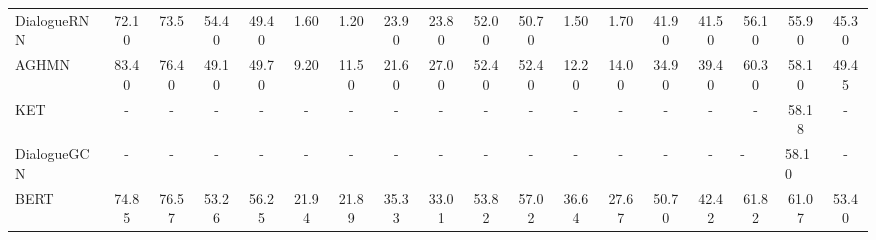 \documentclass[letterpaper]{article} \usepackage{aaai21}  \usepackage{times}  \usepackage{helvet} \usepackage{courier}  \usepackage[hyphens]{url}  \usepackage{graphicx} \urlstyle{rm} \def\UrlFont{\rm}  \usepackage{natbib}  \usepackage{caption} \usepackage{multirow}
\begin{document}
\begin{table*}
{\begin{tabular}{@{}l|ccccccccccccccccc@{}}
DialogueRNN\cite{DialogueRNN}              & 72.10                     & \multicolumn{1}{c|}{73.5}           & 54.40                     & \multicolumn{1}{c|}{49.40}          & 1.60                      & \multicolumn{1}{c|}{1.20}           & 23.90                     & \multicolumn{1}{c|}{23.80}          & 52.00                     & \multicolumn{1}{c|}{50.70}          & 1.50                      & \multicolumn{1}{c|}{1.70}           & 41.90                     & \multicolumn{1}{c|}{41.50}          & 56.10                 & 55.90                     & 45.30          \\
AGHMN\cite{AGHMN}                    & 83.40                     & \multicolumn{1}{c|}{76.40}          & 49.10                     & \multicolumn{1}{c|}{49.70}          & 9.20                      & \multicolumn{1}{c|}{11.50}          & 21.60                     & \multicolumn{1}{c|}{27.00}          & 52.40                     & \multicolumn{1}{c|}{52.40}          & 12.20                     & \multicolumn{1}{c|}{14.00}          & 34.90                     & \multicolumn{1}{c|}{39.40}          & 60.30                 & 58.10                     & 49.45          \\
KET\cite{KET}                      & -                         & \multicolumn{1}{c|}{-}              & -                         & \multicolumn{1}{c|}{-}              & -                         & \multicolumn{1}{c|}{-}              & -                         & \multicolumn{1}{c|}{-}              & -                         & \multicolumn{1}{c|}{-}              & -                         & \multicolumn{1}{c|}{-}              & -                         & \multicolumn{1}{c|}{-}              & -                     & 58.18                     & -              \\
DialogueGCN\cite{DialogueGCN}              & -                         & \multicolumn{1}{c|}{-}              & -                         & \multicolumn{1}{c|}{-}              & -                         & \multicolumn{1}{c|}{-}              & -                         & \multicolumn{1}{c|}{-}              & -                         & \multicolumn{1}{c|}{-}              & -                         & \multicolumn{1}{c|}{-}              & -                         & \multicolumn{1}{c|}{-}              & \multicolumn{1}{l}{-} & \multicolumn{1}{l}{58.10} & -              \\ \hline
BERT\cite{BERT}                     & 74.85                     & \multicolumn{1}{c|}{76.57}          & 53.26                     & \multicolumn{1}{c|}{56.25}          & 21.94                     & \multicolumn{1}{c|}{21.89}          & 35.33                     & \multicolumn{1}{c|}{33.01}          & 53.82                     & \multicolumn{1}{c|}{57.02}          & 36.64                     & \multicolumn{1}{c|}{27.67} & 50.70                     & \multicolumn{1}{c|}{42.42}          & 61.82                 & 61.07                     & 53.40          \\ \hline

\end{tabular}}
\end{table*}
\end{document}
